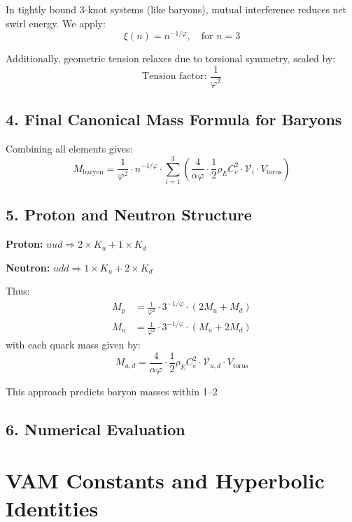 \documentclass[12pt]{article}
\begin{document}
In tightly bound 3-knot systems (like baryons), mutual interference reduces net swirl energy. We apply:
\[
\xi(n) = n^{-1/\varphi}, \quad \text{for } n = 3
\]

Additionally, geometric tension relaxes due to torsional symmetry, scaled by:
\[
\text{Tension factor: } \frac{1}{\varphi^2}
\]

\subsection*{4. Final Canonical Mass Formula for Baryons}

Combining all elements gives:
\[
\boxed{
M_{\text{baryon}} = \frac{1}{\varphi^2} \cdot n^{-1/\varphi} \cdot \sum_{i=1}^{3} \left( \frac{4}{\alpha \varphi} \cdot \frac{1}{2} \rho_{\scriptscriptstyle\boldsymbol\!E}C_e^2 \cdot \mathcal{V}_i \cdot V_{\text{torus}} \right)
}
\]

\subsection*{5. Proton and Neutron Structure}

\textbf{Proton:} \( uud \Rightarrow 2 \times K_u + 1 \times K_d \)

\textbf{Neutron:} \( udd \Rightarrow 1 \times K_u + 2 \times K_d \)

Thus:
\[
\begin{aligned}
M_p &= \frac{1}{\varphi^2} \cdot 3^{-1/\varphi} \cdot \left(2M_u + M_d\right) \\
M_n &= \frac{1}{\varphi^2} \cdot 3^{-1/\varphi} \cdot \left(M_u + 2M_d\right)
\end{aligned}
\]
with each quark mass given by:
\[
M_{u,d} = \frac{4}{\alpha \varphi} \cdot \frac{1}{2} \rho_{\scriptscriptstyle\boldsymbol\!E}C_e^2 \cdot \mathcal{V}_{u,d} \cdot V_{\text{torus}}
\]

This approach predicts baryon masses within 1–2%


\subsection*{6. Numerical Evaluation}
\section*{VAM Constants and Hyperbolic Identities}
\end{document}
